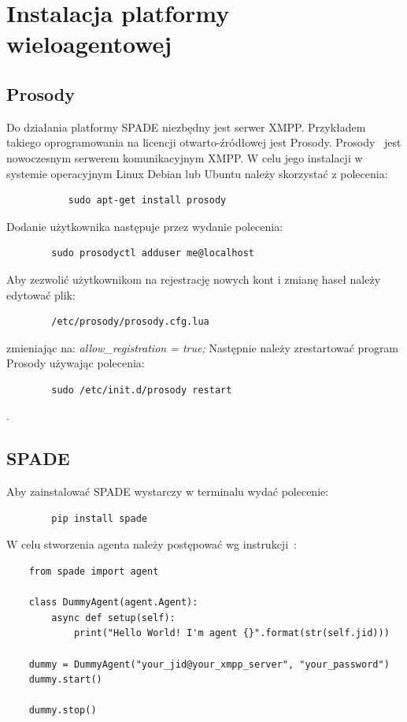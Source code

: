 \documentclass[11pt]{report}
\begin{document}
    \newpage
    \printbibliography[title={Bibliografia}]

    \appendix
    \newpage


    \chapter{Instalacja platformy wieloagentowej}


    \section{Prosody}
    Do działania platformy SPADE niezbędny jest serwer XMPP\@.
    Przykładem takiego oprogramowania na licencji otwarto-źródłowej jest Prosody.
    Prosody~\cite{prosody} jest nowoczesnym serwerem komunikacyjnym XMPP\@.
    W celu jego instalacji w systemie operacyjnym Linux Debian lub Ubuntu należy skorzystać z polecenia:
    \begin{verbatim}
           sudo apt-get install prosody
    \end{verbatim}

    Dodanie użytkownika następuje przez wydanie polecenia:
    \begin{verbatim}
        sudo prosodyctl adduser me@localhost
    \end{verbatim}

    Aby zezwolić użytkownikom na rejestrację nowych kont i zmianę haseł należy edytować plik:
    \begin{verbatim}
        /etc/prosody/prosody.cfg.lua
    \end{verbatim}
    zmieniając na: \textit{allow\_registration = true;}
    Następnie należy zrestartować program Prosody używając polecenia:
    \begin{verbatim}
        sudo /etc/init.d/prosody restart
    \end{verbatim}.


    \section{SPADE}

    Aby zainstalować SPADE wystarczy w terminalu wydać polecenie:
    \begin{verbatim}
        pip install spade
    \end{verbatim}

    W celu stworzenia agenta należy postępować wg instrukcji~\cite{SPADEquickstart}:
    \begin{verbatim}
    from spade import agent

    class DummyAgent(agent.Agent):
        async def setup(self):
            print("Hello World! I'm agent {}".format(str(self.jid)))

    dummy = DummyAgent("your_jid@your_xmpp_server", "your_password")
    dummy.start()

    dummy.stop()
    \end{verbatim}
\end{document}
